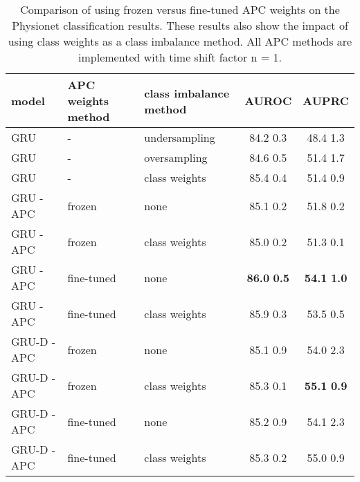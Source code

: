 \documentclass{article}
\begin{document}
\begin{table}[h]
\caption{Comparison of using frozen versus fine-tuned APC weights on the Physionet classification results. 
These results also show the impact of using class weights as a class imbalance method.
All APC methods are implemented with time shift factor n = 1.}
\vskip 0.1in
\begin{center}
\begin{small}
\begin{sc}
\begin{tabular}{lllcc}
\toprule
model & APC weights method & class imbalance method & AUROC & AUPRC \\
\midrule
GRU & - & undersampling & 84.2  0.3 & 48.4  1.3\\ 
\hline 
GRU & - & oversampling & 84.6  0.5 & 51.4  1.7 \\
\hline 
GRU & - & class weights & 85.4  0.4 & 51.4  0.9\\ 
\hhline{=====}
GRU - APC  & frozen & none &  85.1  0.2 &  51.8  0.2\\ 
\hline 
GRU - APC & frozen & class weights &  85.0  0.2 & 51.3  0.1 \\
\hline 
GRU - APC  & fine-tuned & none & \textbf{86.0}  \textbf{0.5} & \textbf{54.1}  \textbf{1.0}\\ 
\hline 
GRU - APC & fine-tuned & class weights & 85.9  0.3 & 53.5  0.5\\ 
\hhline{=====}
GRU-D - APC & frozen & none & 85.1  0.9 & 54.0  2.3\\ 
\hline 
GRU-D - APC & frozen & class weights &  85.3  0.1 & \textbf{55.1}  \textbf{0.9}\\ 
\hline 
GRU-D - APC & fine-tuned & none & 85.2  0.9  & 54.1  2.3\\ 
\hline 
GRU-D - APC & fine-tuned & class weights & 85.3  0.2 & 55.0  0.9\\
\bottomrule
\end{tabular}
\end{sc}
\end{small}
\end{center}
\vskip -0.15in
\end{table}
\end{document}
